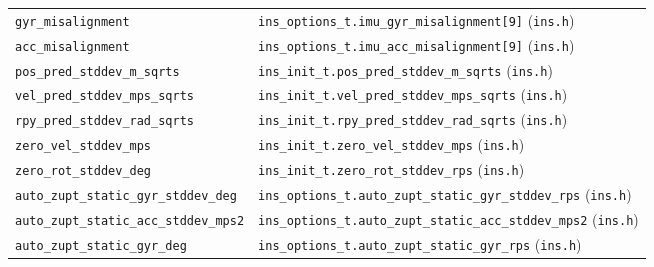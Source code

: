 \documentclass[11pt,a4paper]{article}
\newcommand{\code}[1]{\texttt{#1}}
\begin{document}
\begin{landscape}
\begin{center}
\begin{longtable}{@{}p{6.5cm}p{16.5cm}@{}}
\code{gyr\_\allowbreak{}misalignment}    & \code{ins\_\allowbreak{}options\_\allowbreak{}t.imu\_\allowbreak{}gyr\_\allowbreak{}misalignment[9]} (\code{ins.h}) \\
\code{acc\_\allowbreak{}misalignment}    & \code{ins\_\allowbreak{}options\_\allowbreak{}t.imu\_\allowbreak{}acc\_\allowbreak{}misalignment[9]} (\code{ins.h}) \\
\code{pos\_\allowbreak{}pred\_\allowbreak{}stddev\_\allowbreak{}m\_\allowbreak{}sqrts} & \code{ins\_\allowbreak{}init\_\allowbreak{}t.pos\_\allowbreak{}pred\_\allowbreak{}stddev\_\allowbreak{}m\_\allowbreak{}sqrts} (\code{ins.h}) \\
\code{vel\_\allowbreak{}pred\_\allowbreak{}stddev\_\allowbreak{}mps\_\allowbreak{}sqrts} & \code{ins\_\allowbreak{}init\_\allowbreak{}t.vel\_\allowbreak{}pred\_\allowbreak{}stddev\_\allowbreak{}mps\_\allowbreak{}sqrts} (\code{ins.h}) \\
\code{rpy\_\allowbreak{}pred\_\allowbreak{}stddev\_\allowbreak{}rad\_\allowbreak{}sqrts} & \code{ins\_\allowbreak{}init\_\allowbreak{}t.rpy\_\allowbreak{}pred\_\allowbreak{}stddev\_\allowbreak{}rad\_\allowbreak{}sqrts} (\code{ins.h}) \\
\code{zero\_\allowbreak{}vel\_\allowbreak{}stddev\_\allowbreak{}mps} & \code{ins\_\allowbreak{}init\_\allowbreak{}t.zero\_\allowbreak{}vel\_\allowbreak{}stddev\_\allowbreak{}mps} (\code{ins.h}) \\
\code{zero\_\allowbreak{}rot\_\allowbreak{}stddev\_\allowbreak{}deg} & \code{ins\_\allowbreak{}init\_\allowbreak{}t.zero\_\allowbreak{}rot\_\allowbreak{}stddev\_\allowbreak{}rps} (\code{ins.h}) \\
\code{auto\_\allowbreak{}zupt\_\allowbreak{}static\_\allowbreak{}gyr\_\allowbreak{}stddev\_\allowbreak{}deg} & \code{ins\_\allowbreak{}options\_\allowbreak{}t.auto\_\allowbreak{}zupt\_\allowbreak{}static\_\allowbreak{}gyr\_\allowbreak{}stddev\_\allowbreak{}rps} (\code{ins.h}) \\
\code{auto\_\allowbreak{}zupt\_\allowbreak{}static\_\allowbreak{}acc\_\allowbreak{}stddev\_\allowbreak{}mps2} & \code{ins\_\allowbreak{}options\_\allowbreak{}t.auto\_\allowbreak{}zupt\_\allowbreak{}static\_\allowbreak{}acc\_\allowbreak{}stddev\_\allowbreak{}mps2} (\code{ins.h}) \\
\code{auto\_\allowbreak{}zupt\_\allowbreak{}static\_\allowbreak{}gyr\_\allowbreak{}deg} & \code{ins\_\allowbreak{}options\_\allowbreak{}t.auto\_\allowbreak{}zupt\_\allowbreak{}static\_\allowbreak{}gyr\_\allowbreak{}rps} (\code{ins.h}) \\

\end{longtable}
\end{center}
\end{landscape}
\end{document}

